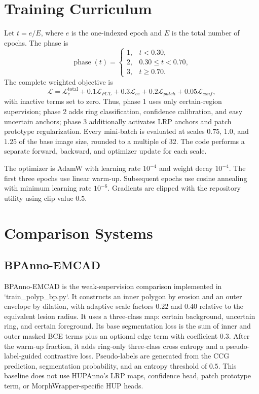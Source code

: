 \documentclass[journal]{IEEEtran}
\begin{document}
\section{Training Curriculum}
Let $t=e/E$, where $e$ is the one-indexed epoch and $E$ is the total number of epochs. The phase is
\begin{equation}
 \operatorname{phase}(t)=
 \begin{cases}
 1,&t<0.30,\\
 2,&0.30\le t<0.70,\\
 3,&t\ge0.70.
 \end{cases}
\end{equation}
The complete weighted objective is
\begin{equation}
 \mathcal{L}=\mathcal{L}_c^{\mathrm{total}}+0.1\mathcal{L}_{PCL}+0.3\mathcal{L}_{ce}+0.2\mathcal{L}_{patch}+0.05\mathcal{L}_{conf},
\end{equation}
with inactive terms set to zero. Thus, phase 1 uses only certain-region supervision; phase 2 adds ring classification, confidence calibration, and easy uncertain anchors; phase 3 additionally activates LRP anchors and patch prototype regularization. Every mini-batch is evaluated at scales $0.75$, $1.0$, and $1.25$ of the base image size, rounded to a multiple of 32. The code performs a separate forward, backward, and optimizer update for each scale.

The optimizer is AdamW with learning rate $10^{-4}$ and weight decay $10^{-4}$. The first three epochs use linear warm-up. Subsequent epochs use cosine annealing with minimum learning rate $10^{-6}$. Gradients are clipped with the repository utility using clip value $0.5$.

\section{Comparison Systems}
\subsection{BPAnno-EMCAD}
BPAnno-EMCAD is the weak-supervision comparison implemented in `train_polyp_bp.py`. It constructs an inner polygon by erosion and an outer envelope by dilation, with adaptive scale factors $0.22$ and $0.40$ relative to the equivalent lesion radius. It uses a three-class map: certain background, uncertain ring, and certain foreground. Its base segmentation loss is the sum of inner and outer masked BCE terms plus an optional edge term with coefficient $0.3$. After the warm-up fraction, it adds ring-only three-class cross entropy and a pseudo-label-guided contrastive loss. Pseudo-labels are generated from the CCG prediction, segmentation probability, and an entropy threshold of $0.5$. This baseline does not use HUPAnno's LRP maps, confidence head, patch prototype term, or MorphWrapper-specific HUP heads.
\end{document}
